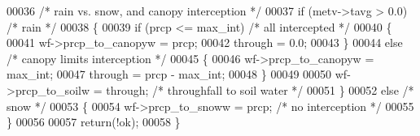 \begin{DoxyCode}
00036     \textcolor{comment}{/* rain vs. snow, and canopy interception */}
00037     \textcolor{keywordflow}{if} (metv->tavg > 0.0)             \textcolor{comment}{/* rain */}
00038     \{
00039         \textcolor{keywordflow}{if} (prcp <= max\_int)          \textcolor{comment}{/* all intercepted */}
00040         \{
00041             wf->prcp\_to\_canopyw = prcp; 
00042             through = 0.0;
00043         \}
00044         \textcolor{keywordflow}{else}                          \textcolor{comment}{/* canopy limits interception */}
00045         \{
00046             wf->prcp\_to\_canopyw = max\_int;
00047             through = prcp - max\_int;
00048         \}
00049         
00050         wf->prcp\_to\_soilw = through;  \textcolor{comment}{/* throughfall to soil water */}
00051     \}
00052     \textcolor{keywordflow}{else}                              \textcolor{comment}{/* snow */}
00053     \{
00054         wf->prcp\_to\_snoww = prcp;     \textcolor{comment}{/* no interception */}
00055     \}
00056     
00057     \textcolor{keywordflow}{return}(!ok);
00058 \}
\end{DoxyCode}
